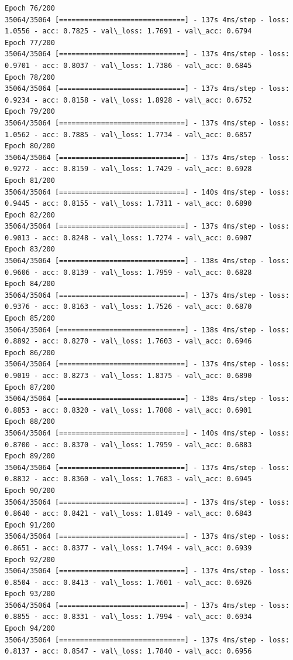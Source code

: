 \documentclass[11pt]{article}
\begin{document}
\begin{Verbatim}[commandchars=\\\{\}]
Epoch 76/200
35064/35064 [==============================] - 137s 4ms/step - loss: 1.0556 - acc: 0.7825 - val\_loss: 1.7691 - val\_acc: 0.6794
Epoch 77/200
35064/35064 [==============================] - 137s 4ms/step - loss: 0.9701 - acc: 0.8037 - val\_loss: 1.7386 - val\_acc: 0.6845
Epoch 78/200
35064/35064 [==============================] - 137s 4ms/step - loss: 0.9234 - acc: 0.8158 - val\_loss: 1.8928 - val\_acc: 0.6752
Epoch 79/200
35064/35064 [==============================] - 137s 4ms/step - loss: 1.0562 - acc: 0.7885 - val\_loss: 1.7734 - val\_acc: 0.6857
Epoch 80/200
35064/35064 [==============================] - 137s 4ms/step - loss: 0.9272 - acc: 0.8159 - val\_loss: 1.7429 - val\_acc: 0.6928
Epoch 81/200
35064/35064 [==============================] - 140s 4ms/step - loss: 0.9445 - acc: 0.8155 - val\_loss: 1.7311 - val\_acc: 0.6890
Epoch 82/200
35064/35064 [==============================] - 137s 4ms/step - loss: 0.9013 - acc: 0.8248 - val\_loss: 1.7274 - val\_acc: 0.6907
Epoch 83/200
35064/35064 [==============================] - 138s 4ms/step - loss: 0.9606 - acc: 0.8139 - val\_loss: 1.7959 - val\_acc: 0.6828
Epoch 84/200
35064/35064 [==============================] - 137s 4ms/step - loss: 0.9376 - acc: 0.8163 - val\_loss: 1.7526 - val\_acc: 0.6870
Epoch 85/200
35064/35064 [==============================] - 138s 4ms/step - loss: 0.8892 - acc: 0.8270 - val\_loss: 1.7603 - val\_acc: 0.6946
Epoch 86/200
35064/35064 [==============================] - 137s 4ms/step - loss: 0.9019 - acc: 0.8273 - val\_loss: 1.8375 - val\_acc: 0.6890
Epoch 87/200
35064/35064 [==============================] - 138s 4ms/step - loss: 0.8853 - acc: 0.8320 - val\_loss: 1.7808 - val\_acc: 0.6901
Epoch 88/200
35064/35064 [==============================] - 140s 4ms/step - loss: 0.8700 - acc: 0.8370 - val\_loss: 1.7959 - val\_acc: 0.6883
Epoch 89/200
35064/35064 [==============================] - 137s 4ms/step - loss: 0.8832 - acc: 0.8360 - val\_loss: 1.7683 - val\_acc: 0.6945
Epoch 90/200
35064/35064 [==============================] - 137s 4ms/step - loss: 0.8640 - acc: 0.8421 - val\_loss: 1.8149 - val\_acc: 0.6843
Epoch 91/200
35064/35064 [==============================] - 137s 4ms/step - loss: 0.8651 - acc: 0.8377 - val\_loss: 1.7494 - val\_acc: 0.6939
Epoch 92/200
35064/35064 [==============================] - 137s 4ms/step - loss: 0.8504 - acc: 0.8413 - val\_loss: 1.7601 - val\_acc: 0.6926
Epoch 93/200
35064/35064 [==============================] - 137s 4ms/step - loss: 0.8855 - acc: 0.8331 - val\_loss: 1.7994 - val\_acc: 0.6934
Epoch 94/200
35064/35064 [==============================] - 137s 4ms/step - loss: 0.8137 - acc: 0.8547 - val\_loss: 1.7840 - val\_acc: 0.6956

\end{Verbatim}
\end{document}
